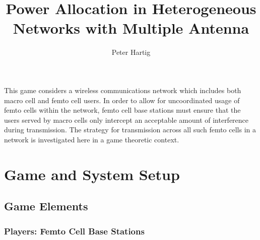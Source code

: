 \documentclass[12pt]{article}
\title{Power Allocation in Heterogeneous Networks with Multiple Antenna }
\author{Peter Hartig}
\begin{document}
\maketitle


This game considers a wireless communications network which includes both macro cell and femto cell users. In order to allow for uncoordinated usage of femto cells within the network, femto cell base stations must ensure that the users served by macro cells only intercept an acceptable amount of interference during transmission. The strategy for transmission across all such femto cells in a network is investigated here in a game theoretic context. 


\newpage
\tableofcontents
\newpage

\section{Game and System Setup}

\subsection{Game Elements}

\subsubsection{Players: Femto Cell Base Stations}
\end{document}
